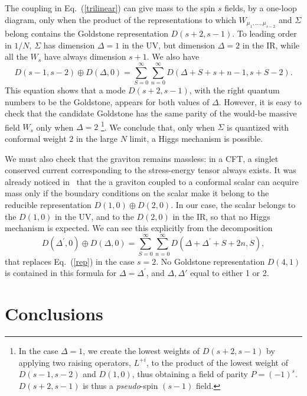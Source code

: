 \documentclass[a4paper,12pt]{article}
\begin{document}
The coupling in Eq.~(\ref{trilinear}) can give mass to the 
spin $s$ fields, by a one-loop diagram, only when the product of the 
representations to which $W_{\mu_1,...,\mu_{s-2}}$ and $\Sigma$ belong
contains the Goldstone representation $D(s+2,s-1)$. 
To leading order in $1/N$, 
$\Sigma$ has dimension $\Delta=1$ in the UV, but dimension 
$\Delta=2$ in the IR, while all the $W_s$ have always dimension $s+1$. 
We also have \cite{he}
\begin{equation}
D(s-1,s-2)\oplus D(\Delta,0)=\sum_{S=0}^\infty\sum_{n=0}^\infty 
D(\Delta+S+s+n-1,s+S-2).
\label{rep}
\end{equation}
This equation shows that a mode $D(s+2,s-1)$, with the right quantum
numbers to be the Goldstone, appears for both values of
$\Delta$. However, it is easy to check that the candidate Goldstone
has the same parity of the would-be massive field $W_s$ only when
$\Delta=2$ \footnote{In the case $\Delta=1$, we create the lowest
weights of $D(s+2,s-1)$ by applying two raising operators, $L^{+i}$,
to the product of the lowest weight of $D(s-1,s-2)$ and $D(1,0)$, thus
obtaining a field of parity $P=(-1)^s$. $D(s+2,s-1)$ is thus a {\it
pseudo}-spin $(s-1)$ field.}.  We conclude that, only when $\Sigma$ is
quantized with conformal weight $2$ in the large $N$ limit, a Higgs
mechanism is possible.

We must also check that the graviton remains massless: in a CFT, a
singlet conserved current corresponding to the stress-energy tensor
always exists.  It was already noticed in~\cite{porrati} that the a
graviton coupled to a conformal scalar can acquire mass only if the
boundary conditions on the scalar make it belong to the reducible
representation $D(1,0)\oplus D(2,0)$.  In our case, the scalar belongs
to the $D(1,0)$ in the UV, and to the $D(2,0)$ in the IR, so that no
Higgs mechanism is expected.  We can see this explicitly from the
decomposition
\begin{equation}
D(\Delta^\prime,0)\oplus D(\Delta,0)=\sum_{S=0}^\infty\sum_{n=0}^\infty 
D(\Delta+\Delta^\prime+S+2n,S),
\label{rep2}
\end{equation}
that replaces Eq.~(\ref{rep}) in the case $s=2$. No Goldstone
representation $D(4,1)$ is contained in this formula for
$\Delta=\Delta^\prime$, and $\Delta,\Delta'$ equal to either 1 or 2.

\section{Conclusions}
\end{document}
